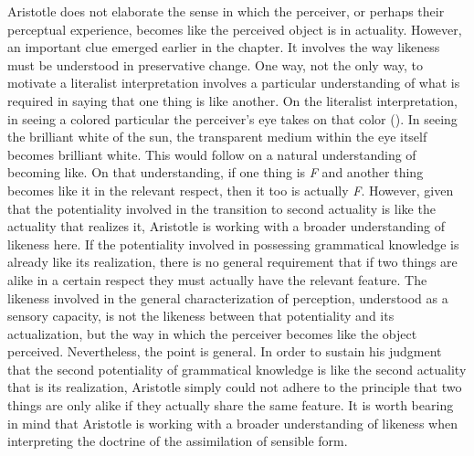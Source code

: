 Aristotle does not elaborate the sense in which the perceiver, or perhaps their perceptual experience, becomes like the perceived object is in actuality. However, an important clue emerged earlier in the chapter. It involves the way likeness must be understood in preservative change. One way, not the only way, to motivate a literalist interpretation involves a particular understanding of what is required in saying that one thing is like another. On the literalist interpretation, in seeing a colored particular the perceiver's eye takes on that color (\citealt{Slakey:1961ss,Sorabji:1974fk,Sorabji:2003fk,Everson:1997ep}). In seeing the brilliant white of the sun, the transparent medium within the eye itself becomes brilliant white. This would follow on a natural understanding of becoming like. On that understanding, if one thing is \emph{F} and another thing becomes like it in the relevant respect, then it too is actually \emph{F}. However, given that the potentiality involved in the transition to second actuality is like the actuality that realizes it, Aristotle is working with a broader understanding of likeness here. If the potentiality involved in possessing grammatical knowledge is already like its realization, there is no general requirement that if two things are alike in a certain respect they must actually have the relevant feature. The likeness involved in the general characterization of perception, understood as a sensory capacity, is not the likeness between that potentiality and its actualization, but the way in which the perceiver becomes like the object perceived. Nevertheless, the point is general. In order to sustain his judgment that the second potentiality of grammatical knowledge is like the second actuality that is its realization, Aristotle simply could not adhere to the principle that two things are only alike if they actually share the same feature. It is worth bearing in mind that Aristotle is working with a broader understanding of likeness when interpreting the doctrine of the assimilation of sensible form.


